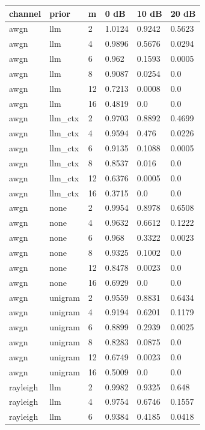 \begin{tabular}{llllll}
\hline
channel & prior & m & 0 dB & 10 dB & 20 dB \\
\hline
awgn & llm & 2 & 1.0124 & 0.9242 & 0.5623 \\
awgn & llm & 4 & 0.9896 & 0.5676 & 0.0294 \\
awgn & llm & 6 & 0.962 & 0.1593 & 0.0005 \\
awgn & llm & 8 & 0.9087 & 0.0254 & 0.0 \\
awgn & llm & 12 & 0.7213 & 0.0008 & 0.0 \\
awgn & llm & 16 & 0.4819 & 0.0 & 0.0 \\
awgn & llm\_ctx & 2 & 0.9703 & 0.8892 & 0.4699 \\
awgn & llm\_ctx & 4 & 0.9594 & 0.476 & 0.0226 \\
awgn & llm\_ctx & 6 & 0.9135 & 0.1088 & 0.0005 \\
awgn & llm\_ctx & 8 & 0.8537 & 0.016 & 0.0 \\
awgn & llm\_ctx & 12 & 0.6376 & 0.0005 & 0.0 \\
awgn & llm\_ctx & 16 & 0.3715 & 0.0 & 0.0 \\
awgn & none & 2 & 0.9954 & 0.8978 & 0.6508 \\
awgn & none & 4 & 0.9632 & 0.6612 & 0.1222 \\
awgn & none & 6 & 0.968 & 0.3322 & 0.0023 \\
awgn & none & 8 & 0.9325 & 0.1002 & 0.0 \\
awgn & none & 12 & 0.8478 & 0.0023 & 0.0 \\
awgn & none & 16 & 0.6929 & 0.0 & 0.0 \\
awgn & unigram & 2 & 0.9559 & 0.8831 & 0.6434 \\
awgn & unigram & 4 & 0.9194 & 0.6201 & 0.1179 \\
awgn & unigram & 6 & 0.8899 & 0.2939 & 0.0025 \\
awgn & unigram & 8 & 0.8283 & 0.0875 & 0.0 \\
awgn & unigram & 12 & 0.6749 & 0.0023 & 0.0 \\
awgn & unigram & 16 & 0.5009 & 0.0 & 0.0 \\
rayleigh & llm & 2 & 0.9982 & 0.9325 & 0.648 \\
rayleigh & llm & 4 & 0.9754 & 0.6746 & 0.1557 \\
rayleigh & llm & 6 & 0.9384 & 0.4185 & 0.0418 \\

\end{tabular}
